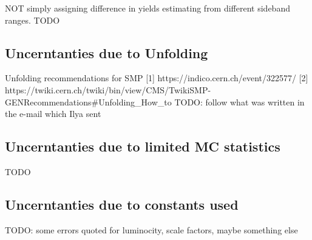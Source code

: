 NOT simply assigning difference in yields estimating from different sideband ranges.
TODO
\subsection{Uncerntanties due to Unfolding}
Unfolding recommendations for SMP 
[1] https://indico.cern.ch/event/322577/ 
[2] https://twiki.cern.ch/twiki/bin/view/CMS/TwikiSMP-GENRecommendations\#Unfolding\_How\_to
TODO: follow what was written in the e-mail which Ilya sent

\subsection{Uncerntanties due to limited MC statistics}
TODO
\subsection{Uncerntanties due to constants used}
TODO: some errors quoted for luminocity, scale factors, maybe something else
